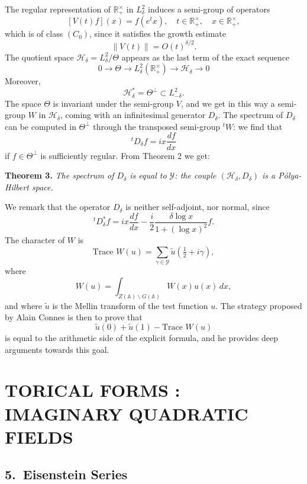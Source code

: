 \documentclass[12pt]{article}
\begin{document}
\medskip

The regular representation of $\mathbb{R}_+^{\times}$ in $L_{\delta}^2$ induces a semi-group of operators
\[
[V(t)f](x) = f(e^t x), \quad t \in \mathbb{R}_+^{\times}, \quad x \in \mathbb{R}_+^{\times},
\]
which is of class $(C_0)$, since it satisfies the growth estimate
\[
\|V(t)\| = O(t)^{\delta/2}.
\]
The quotient space $\mathcal{H}_{\delta} = L_{\delta}^2 / \Theta$ appears as the last term of the exact sequence
\[
0 \longrightarrow \Theta \longrightarrow L_{\delta}^2(\mathbb{R}_+^{\times}) \longrightarrow \mathcal{H}_{\delta} \longrightarrow 0
\]
Moreover,
\[
\mathcal{H}_{\delta}^* = \Theta^{\perp} \subset L_{-\delta}^2.
\]
The space $\Theta$ is invariant under the semi-group $V$, and we get in this way a semi-group $W$ in $\mathcal{H}_{\delta}$, coming with an infinitesimal generator $D_{\delta}$. The spectrum of $D_{\delta}$ can be computed in $\Theta^{\perp}$ through the transposed semi-group ${}^{t}W$: we find that
\[
{}^{t}D_{\delta} f = ix \frac{df}{dx}
\]
if $f \in \Theta^{\perp}$ is sufficiently regular. From Theorem 2 we get:

\medskip

\noindent
\textbf{Theorem 3.} \emph{The spectrum of $D_{\delta}$ is equal to $\mathcal{Y}$: the couple $(\mathcal{H}_{\delta}, D_{\delta})$ is a Pólya-Hilbert space.}

\medskip

We remark that the operator $D_{\delta}$ is neither self-adjoint, nor normal, since
\[
{}^{t}D_{\delta}^* f = ix \frac{df}{dx} - \frac{i}{2} \frac{\delta \log x}{1 + (\log x)^2} f.
\]
The character of $W$ is
\[
\text{Trace } W(u) = \sum_{\gamma \in \mathcal{Y}} \tilde{u}(\tfrac{1}{2} + i\gamma),
\]
where
\[
W(u) = \int_{Z(\mathbb{A}) \backslash G(\mathbb{A})} W(x) u(x)\,dx,
\]
and where $\tilde{u}$ is the Mellin transform of the test function $u$. The strategy proposed by Alain Connes is then to prove that
\[
\tilde{u}(0) + \tilde{u}(1) - \text{Trace } W(u)
\]
is equal to the arithmetic side of the explicit formula, and he provides deep arguments towards this goal.

\section*{TORICAL FORMS : IMAGINARY QUADRATIC FIELDS}

\subsection*{5.\ Eisenstein Series}
\end{document}
